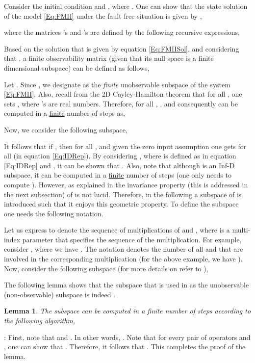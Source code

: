 \documentclass[journal,12pt,draftcls,onecolumn]{IEEEtran}
\newcommand{\infd}{Inf-D }
\def\QEDclosed{\hfill\IEEEQEDclosed}
\renewcommand{\qed}{\QEDclosed}
\renewenvironment{proof}[1][\proofname]{\noindent\nobreakspace{\bfseries #1}:\;}{\qed\par}
\newtheorem{lemma}{Lemma}
\begin{document}
Consider the initial condition  and , where . One can show that the  state solution of the model \eqref{Eq:FMII} under the fault free situation is given by \cite{FMinBook},
\vspace{-1mm}

where the matrices 's and 's are defined by the following recursive  expressions,
\vspace{-2mm}

Based on the solution that is given by equation  \eqref{Eq:FMIISol}, and considering that , a finite observability matrix (given that its null space is a finite dimensional subspace) can be defined as follows,

Let . Since , we designate  as the \emph{finite} unobservable subspace of the system \eqref{Eq:FMII}.  Also, recall from the 2D Cayley-Hamilton theorem \cite{FMinBook} that for all , one sets , where 's are real numbers. Therefore, for all , , and consequently  can be computed in a \underline{finite} number of steps as,


Now, we consider the following subspace,

It follows that if , then  for all , and given the zero input assumption one gets  for all  (in equation \eqref{Eq:IDRep}). By considering , where  is defined as in equation \eqref{Eq:IDRep} and , it can be shown that . Also, note that although  is an \infd subspace, it can be computed in a \underline{finite} number of steps (one only needs to compute ). However, as explained in \cite{ACC2013,ACC2014} the invariance property (this is addressed in the next subsection) of  is not lucid. Therefore, in the following a subspace of  is introduced such that it enjoys this geometric property. To define the subspace  one needs the following notation.

Let us express  to denote the sequence of multiplications of  and ,  where  is a multi-index parameter that specifies the sequence of the multiplication.  For example, consider , where we have .
The notation  denotes the number of all  and  that are involved in the corresponding multiplication (for the above example, we have ). Now, consider the following subspace (for more details on  refer to \cite{ACC2013}),


The following lemma shows that the subspace that is used in \cite{ntogramatzidis2012Siam, Malek_3DFDI, Malek_3DFDIConf} as the unobservable (non-observable) subspace is indeed .


\begin{lemma}\label{Lm:NsisSub}
	The subspace  can be computed in a finite number of steps according to the following algorithm,
	
\end{lemma}
\begin{proof}
	First, note that  and . In other words, . Note that for every pair of operators  and , one can show that . Therefore, it follows that . This completes the proof of the lemma.
\end{proof}
\end{document}
